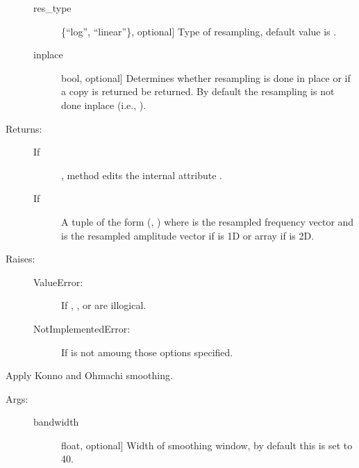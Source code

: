 \documentclass[letterpaper,10pt,english]{sphinxmanual}
\begin{document}
\begin{fulllineitems}
\begin{fulllineitems}
\begin{description}
\begin{description}
\item[{res\_type}] \leavevmode{[}\{“log”, “linear”\}, optional{]}
Type of resampling, default value is .

\item[{inplace}] \leavevmode{[}bool, optional{]}
Determines whether resampling is done in place or 
if a copy is returned be returned. By default the
resampling is not done inplace (i.e., ).

\end{description}

\item[{Returns:}] \leavevmode\begin{description}
\item[{If }] \leavevmode
{}, method edits the internal attribute .

\item[{If }] \leavevmode
A tuple of the form (, )
where  is the resampled frequency vector and 
 is the resampled amplitude vector if 
 is 1D or array if  is 2D.

\end{description}

\item[{Raises:}] \leavevmode\begin{description}
\item[{ValueError:}] \leavevmode
If , , or  are illogical.

\item[{NotImplementedError:}] \leavevmode
If  is not amoung those options specified.

\end{description}

\end{description}

\end{fulllineitems}


\begin{fulllineitems}
\label{\detokenize{index:sigpropy.FourierTransform.smooth_konno_ohmachi}}
Apply Konno and Ohmachi smoothing.
\begin{description}
\item[{Args:}] \leavevmode\begin{description}
\item[{bandwidth}] \leavevmode{[}float, optional{]}
Width of smoothing window, by default this is set to 40.


\end{description}
\end{description}
\end{fulllineitems}
\end{fulllineitems}
\end{document}
